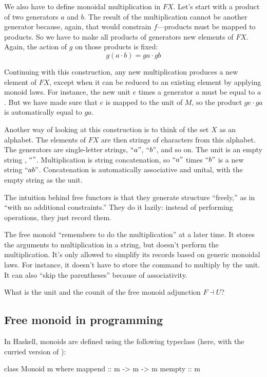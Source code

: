 \documentclass[DaoFP]{subfiles}
\begin{document}
We also have to define monoidal multiplication in $F X$. Let's start with a product of two generators $a$ and $b$. The result of the multiplication cannot be another generator because, again, that would constrain $f$---products must be mapped to products. So we have to make all products of generators new elements of $F X$. Again, the action of $g$ on those products is fixed:
\[ g (a \cdot b)  = g a \cdot g b\]

Continuing with this construction, any new multiplication produces a new element of $F X$, except when it can be reduced to an existing element by applying monoid laws. For instance, the new unit $e$ times a generator $a$ must be equal to $a$. But we have made sure that $e$ is mapped to the unit of $M$, so the product $g e \cdot g a$ is automatically equal to $g a$.

Another way of looking at this construction is to think of the set $X$ as an alphabet. The elements of $FX$ are then strings of characters from this alphabet. The generators are single-letter strings, $``a"$, $``b"$, and so on. The unit is an empty string , $``"$. Multiplication is string concatenation, so  $``a"$ times $``b"$ is a new string  $``ab"$. Concatenation is automatically associative and unital, with the empty string as the unit.

The intuition behind free functors is that they generate structure ``freely,'' as in ``with no additional constraints.'' They do it lazily: instead of performing operations, they just record them. 

The free monoid ``remembers to do the multiplication'' at a later time. It stores the arguments to multiplication in a string, but doesn't perform the multiplication. It's only allowed to simplify its records based on generic monoidal laws. For instance, it doesn't have to store the command to multiply by the unit. It can also ``skip the parentheses'' because of associativity. 

\begin{exercise}
What is the unit and the counit of the free monoid adjunction $F \dashv U$?
\end{exercise}

\subsection{Free monoid in programming}

In Haskell, monoids are defined using the following typeclass (here, with the curried version of ):
\begin{haskell}
class Monoid m where
  mappend :: m -> m -> m
  mempty  :: m
\end{haskell}
\end{document}

